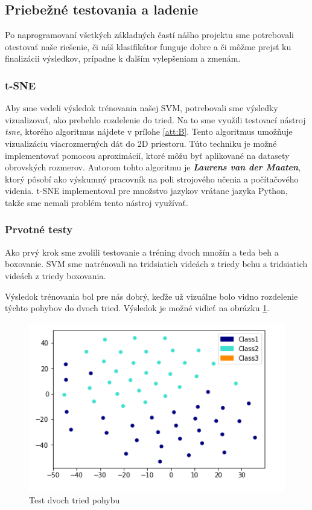 \subsection{Priebežné testovania a ladenie} \label{testalad}
Po naprogramovaní všetkých základných častí nášho projektu sme potrebovali otestovať naše riešenie, či náš klasifikátor funguje dobre a či môžme prejsť ku finalizácii výsledkov, prípadne k ďalším vylepšeniam a zmenám.


\subsubsection{t-SNE}
Aby sme vedeli výsledok trénovania našej SVM, potrebovali sme výsledky vizualizovať, ako prebehlo rozdelenie do tried. Na to sme využili testovací nástroj \textit{\acrfull{tsne}}, ktorého algoritmus nájdete v prílohe \ref{att:B}. Tento algoritmus umožňuje vizualizáciu viacrozmerných dát do 2D priestoru. Túto techniku je možné implementovať pomocou aproximácií, ktoré môžu byť aplikované na datasety obrovských rozmerov. Autorom tohto algoritmu je \textbf{\textit{Laurens van der Maaten}}, ktorý pôsobí ako výskumný pracovník na poli strojového učenia a počítačového videnia. t-SNE implementoval pre množstvo jazykov vrátane jazyka Python, takže sme nemali problém tento nástroj využívať. \cite{c18}



\subsubsection{Prvotné testy}
Ako prvý krok sme zvolili testovanie a tréning dvoch množín a teda beh a boxovanie. SVM sme natrénovali na tridsiatich videách z triedy behu a tridsiatich videách z triedy boxovania. 

Výsledok trénovania bol pre nás dobrý, keďže už vizuálne bolo vidno rozdelenie týchto pohybov do dvoch tried. Výsledok je možné vidieť na obrázku \ref{Test2Class}. 

\begin{figure}[H]
  \centering
  \includegraphics[width=14cm]{img/test2classes.png}
  \caption{Test dvoch tried pohybu}
  \label{Test2Class}
\end{figure} 


